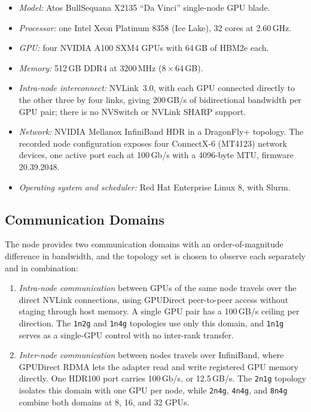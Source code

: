 \begin{itemize}
    \item \emph{Model:} Atos BullSequana X2135 ``Da Vinci'' single-node GPU blade.
    \item \emph{Processor:} one Intel Xeon Platinum 8358 (Ice Lake), 32 cores at 2.60\,GHz.
    \item \emph{GPU:} four NVIDIA A100 SXM4 GPUs with 64\,GB of HBM2e each.
    \item \emph{Memory:} 512\,GB DDR4 at 3200\,MHz ($8 \times 64$\,GB).
    \item \emph{Intra-node interconnect:} NVLink~3.0, with each GPU connected directly to the other three by four links, giving 200\,GB/s of bidirectional bandwidth per GPU pair; there is no NVSwitch or NVLink SHARP support.
    \item \emph{Network:} NVIDIA Mellanox InfiniBand HDR in a DragonFly+ topology. The recorded node configuration exposes four ConnectX-6 (MT4123) network devices, one active port each at 100\,Gb/s with a 4096-byte MTU, firmware 20.39.2048.
    \item \emph{Operating system and scheduler:} Red Hat Enterprise Linux 8, with Slurm.
\end{itemize}

\subsection{Communication Domains}

The node provides two communication domains with an order-of-magnitude difference in bandwidth, and the topology set is chosen to observe each separately and in combination:

\begin{enumerate}
    \item \emph{Intra-node communication} between GPUs of the same node travels over the direct NVLink connections, using GPUDirect peer-to-peer access without staging through host memory. A single GPU pair has a 100\,GB/s ceiling per direction. The \texttt{1n2g} and \texttt{1n4g} topologies use only this domain, and \texttt{1n1g} serves as a single-GPU control with no inter-rank transfer.
    \item \emph{Inter-node communication} between nodes travels over InfiniBand, where GPUDirect RDMA lets the adapter read and write registered GPU memory directly. One HDR100 port carries 100\,Gb/s, or 12.5\,GB/s. The \texttt{2n1g} topology isolates this domain with one GPU per node, while \texttt{2n4g}, \texttt{4n4g}, and \texttt{8n4g} combine both domains at 8, 16, and 32 GPUs.
\end{enumerate}

